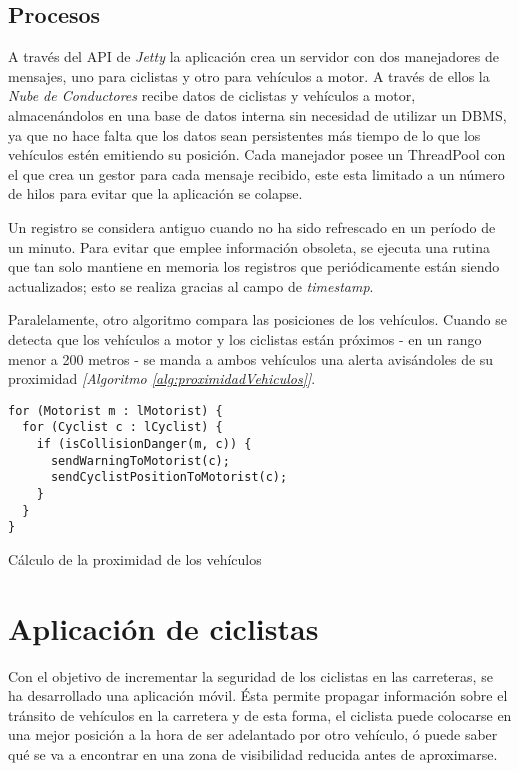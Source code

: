 \subsection{Procesos}\label{ssection:procesos}
A través del API de \emph{Jetty} la aplicación crea un servidor con dos manejadores de mensajes, uno para ciclistas y otro para vehículos a motor. A través de ellos la \emph{Nube de Conductores} recibe datos de ciclistas y vehículos a motor, almacenándolos en una base de datos interna sin necesidad de utilizar un DBMS, ya que no hace falta que los datos sean persistentes más tiempo de lo que los vehículos estén emitiendo su posición. Cada manejador posee un ThreadPool con el que crea un gestor para cada mensaje recibido, este esta limitado a un número de hilos para evitar que la aplicación se colapse. 

Un registro se considera antiguo cuando no ha sido refrescado en un período de un minuto. Para evitar que emplee información obsoleta, se ejecuta una rutina que tan solo mantiene en memoria los registros que periódicamente están siendo actualizados; esto se realiza gracias al campo de \emph{timestamp}.

Paralelamente, otro algoritmo compara las posiciones de los vehículos. Cuando se detecta que los vehículos a motor y los ciclistas están próximos - en un rango menor a 200 metros - se manda a ambos vehículos una alerta avisándoles de su proximidad \emph{[Algoritmo \ref{alg:proximidadVehiculos}]}.

\begin{listing}
	\begin{minipage}{.4\textwidth}
		\begin{verbatim}
for (Motorist m : lMotorist) {
  for (Cyclist c : lCyclist) {
    if (isCollisionDanger(m, c)) {
      sendWarningToMotorist(c);
      sendCyclistPositionToMotorist(c);
    }
  }
}
		\end{verbatim}
	\end{minipage}
	\caption{Cálculo de la proximidad de los vehículos}\label{alg:proximidadVehiculos}
\end{listing}
\section{Aplicación de ciclistas}\label{section:appCiclistas}
Con el objetivo de incrementar la seguridad de los ciclistas en las carreteras, se ha desarrollado una aplicación móvil. Ésta permite propagar información sobre el tránsito de vehículos en la carretera y de esta forma, el ciclista puede colocarse en una mejor posición a la hora de ser adelantado por otro vehículo, ó puede saber qué se va a encontrar en una zona de visibilidad reducida antes de aproximarse.

